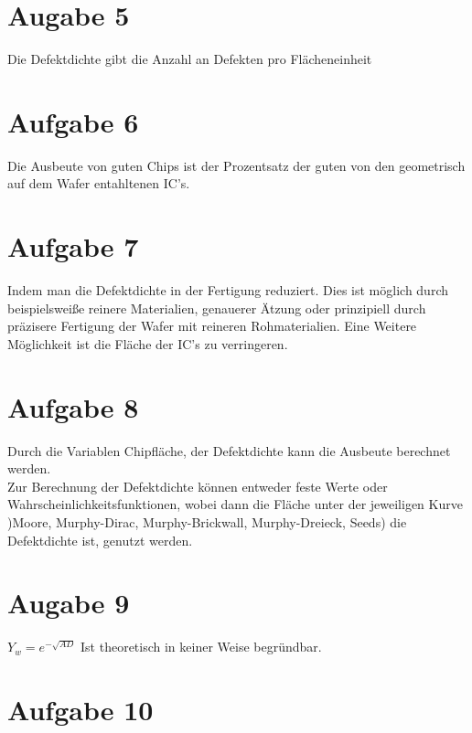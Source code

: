 \documentclass[a4paper]{scrartcl}
\begin{document}
\section*{Augabe 5}
Die Defektdichte gibt die Anzahl an Defekten pro Flächeneinheit 


\section*{Aufgabe 6}
Die Ausbeute von guten Chips ist der Prozentsatz der guten von den geometrisch auf dem Wafer entahltenen IC's.


\section*{Aufgabe 7}
Indem man die Defektdichte in der Fertigung reduziert. Dies ist möglich durch beispielsweiße reinere Materialien, genauerer Ätzung oder prinzipiell durch präzisere Fertigung  der Wafer mit reineren Rohmaterialien. Eine Weitere Möglichkeit ist die Fläche der IC's zu verringeren.


\section*{Aufgabe 8}
Durch die Variablen Chipfläche, der Defektdichte kann die Ausbeute berechnet werden.\\
Zur Berechnung der Defektdichte können entweder feste Werte oder Wahrscheinlichkeitsfunktionen, wobei dann die Fläche unter der jeweiligen Kurve )Moore, Murphy-Dirac, Murphy-Brickwall, Murphy-Dreieck, Seeds) die Defektdichte ist, genutzt werden.

\section*{Augabe 9}
$Y_w = e^{-\sqrt{AD}}$
Ist theoretisch in keiner Weise begründbar.


\section*{Aufgabe 10}
\end{document}
